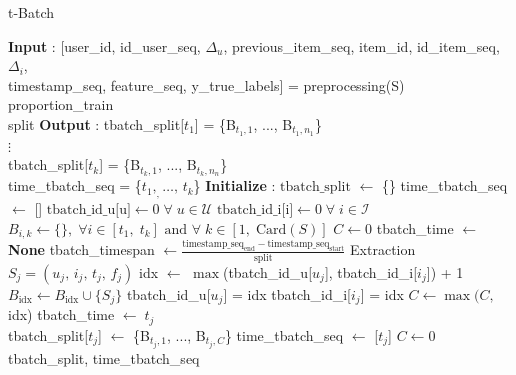 \begin{algorithm}[H]
    \caption{t-Batch}
    \begin{algorithmic} 
        \STATE \textbf{Input} :  [user\_id, id\_user\_seq, $\Delta_u$, previous\_item\_seq, item\_id, id\_item\_seq, $\Delta_i$,\\
        \hspace{1.2cm}timestamp\_seq, feature\_seq, y\_true\_labels] = preprocessing(S)\\
        \hspace{1.1cm} proportion\_train\\
        \hspace{1.1cm} split
        \STATE \textbf{Output} : tbatch\_split[${t_1}$] = \{B$_{t_1,1}$, ..., B$_{t_1,n_1}$\} \\
        \hspace{3.55cm} $\vdots$\\
        \hspace{1.3cm} tbatch\_split[${t_k}$] = \{B$_{t_k,1}$, ..., B$_{t_k,n_n}$\}\\
        \hspace{1.3cm} time\_tbatch\_seq = \{$t_1,_,\hdots,\,t_k$\}
        \STATE \textbf{Initialize} : 
        \STATE \quad $\text{tbatch\_split}$ $\leftarrow$ \{\}
        \STATE \quad time\_tbatch\_seq $\leftarrow$ []
        \STATE \quad $\text{tbatch\_id\_u[u]} \leftarrow 0 \; \forall \; u \in \mathcal{U}$
        \STATE \quad $\text{tbatch\_id\_i[i]} \leftarrow 0 \; \forall \; i \in \mathcal{I}$
        \STATE \quad $B_{i,k} \leftarrow \{ \},\; \forall i \in [t_1,\;t_k]\text{ and }\forall \; k \in [1,\;\text{Card}(S)]$
        \STATE \quad $C \leftarrow 0$
        \STATE \quad tbatch\_time $\leftarrow$ \textbf{None}
        \STATE \quad tbatch\_timespan $\leftarrow \frac{\text{timestamp\_seq}_{\text{end}} - \text{timestamp\_seq}_{\text{start}}}{\text{split}}$
            \STATE Extraction $S_j = (u_j,\,i_j,\,t_j,\,f_j)$
            \STATE idx $\leftarrow$ $\max$(tbatch\_id\_u[$u_j$], tbatch\_id\_i[$i_j$]) + 1
            \STATE $B_\text{idx} \leftarrow B_\text{idx} \cup \{ S_j \}$
            \STATE tbatch\_id\_u[$u_j$] = idx
            \STATE tbatch\_id\_i[$i_j$] = idx
            \STATE $C \leftarrow \max(C,\,$idx)
            \STATE tbatch\_time $\leftarrow \; t_j$
            \ENDIF\\
            \STATE tbatch\_split[$t_j$] $\leftarrow$ \{B$_{t_j,1}$, ..., B$_{t_j,C}$\}
            \STATE time\_tbatch\_seq $\leftarrow$ [$t_j$]
            \STATE $C \leftarrow 0$
            \ENDIF
        \ENDFOR
        \RETURN tbatch\_split, time\_tbatch\_seq
    \end{algorithmic}
\end{algorithm}


